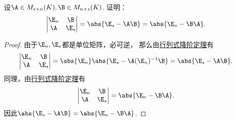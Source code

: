 \begin{example}\label{example:逆矩阵.行列式降阶定理的重要应用1}
设\(\A \in M_{s \times n}(K),
\B \in M_{n \times s}(K)\).
证明：\[
	\begin{vmatrix}
		\E_n & \B \\
		\A & \E_s
	\end{vmatrix}
	= \abs{\E_s - \A \B}
	= \abs{\E_n - \B \A}.
\]
\begin{proof}
由于\(\E_n,\E_s\)都是单位矩阵，必可逆，
那么由\hyperref[equation:逆矩阵.行列式降阶公式1]{行列式降阶定理}有\begin{equation*}
	\begin{vmatrix}
		\E_n & \B \\
		\A & \E_s
	\end{vmatrix}
	= \abs{\E_n} \abs{\E_s - \A(\E_n)^{-1}\B}
	= \abs{\E_s - \A \B}.
\end{equation*}
同理，由\hyperref[equation:逆矩阵.行列式降阶公式2]{行列式降阶定理}有\begin{equation*}
	\begin{vmatrix}
		\E_n & \B \\
		\A & \E_s
	\end{vmatrix}
	= \abs{\E_n - \B \A}.
\end{equation*}
因此\(\abs{\E_s - \A \B} = \abs{\E_n - \B \A}\).
\end{proof}
\end{example}

